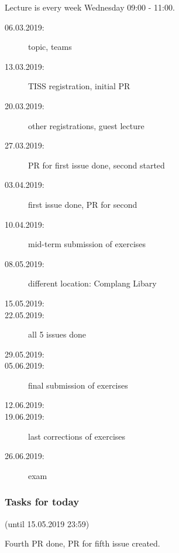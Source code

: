 





\date{15.05.2018}



\renewcommand{\enquote}[1]{\emph{``#1''}} %

\begin{frame}
	\titlepage
	\doclicenseThis
\end{frame}


\begin{frame}
	Lecture is every week Wednesday 09:00 - 11:00.

	\begin{description}
		\item[06.03.2019:] {\color{gray}topic, teams}
		\item[13.03.2019:] {\color{gray}TISS registration, initial PR}
		\item[20.03.2019:] {\color{gray}other registrations, guest lecture}
		\item[27.03.2019:] {\color{gray}PR for first issue done, second started}
		\item[03.04.2019:] {\color{gray}first issue done, PR for second}
		\item[10.04.2019:] {\color{gray}mid-term submission of exercises}
		\item[08.05.2019:] {\color{gray}different location: Complang Libary}
		\item[15.05.2019:]
		\item[22.05.2019:] all 5 issues done
		\item[29.05.2019:]
		\item[05.06.2019:] final submission of exercises
		\item[12.06.2019:]
		\item[19.06.2019:] last corrections of exercises
		\item[26.06.2019:] exam
	\end{description}
\end{frame}

\begin{assignment}
	\frametitle{Tasks for today}
	(until 15.05.2019 23:59)

	\begin{task}
	Fourth PR done, PR for fifth issue created.
	\end{task}
\end{assignment}

